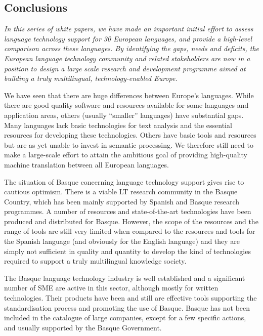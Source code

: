 \begin{multicols}{2}
\subsection{Conclusions}

    \emph{   In this series of white papers, we have made an important initial effort to assess language technology support for 30 European languages, and provide a high-level comparison across these languages. By identifying the gaps, needs and deficits, the European language technology community and related stakeholders are now in a position to design a large scale research and development programme aimed at building a truly multilingual, technology-enabled Europe.}

    We have seen that there are huge differences between Europe’s languages. While there are good quality software and resources available for some languages and application areas, others (usually “smaller” languages) have substantial gaps. Many languages lack basic technologies for text analysis and the essential resources for developing these technologies. Others have basic tools and resources but are as yet unable to invest in semantic processing. We therefore still need to make a large-scale effort to attain the ambitious goal of providing high-quality machine translation between all European languages.

   The situation of Basque concerning language technology support gives rise to cautious optimism. There is a viable LT research community in the Basque Country, which has been mainly supported by Spanish and Basque research programmes. A number of resources and state-of-the-art technologies have been produced and distributed for Basque. However, the scope of the resources and the range of tools are still very limited when compared to the resources and tools for the Spanish language (and obviously for the English language) and they are simply not sufficient in quality and quantity to develop the kind of technologies required to support a truly multilingual knowledge society.

    The Basque language technology industry is well established and a significant number of SME are active in this sector, although mostly for written technologies.  Their products have been and still are effective tools supporting the standardisation process and promoting the use of Basque.  Basque has not been included in the catalogue of large companies, except for a few specific actions, and usually supported by the Basque Government. 


\end{multicols}
